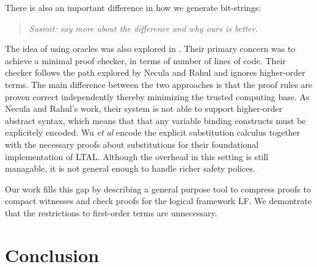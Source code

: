 \documentclass{acmconf}
\newenvironment{note}{\begin{quote}\message{note!}\it}{\end{quote}}
\begin{document}
There is also
an important difference in how we generate bit-strings:

\begin{note}
  Susmit: say more about the difference and why ours is better.
\end{note}

The idea of using oracles was also explored in
\cite{Appel:PPDP03}. Their primary concern was to 
achieve a minimal proof checker, in terms of number of lines of
code. Their checker follows the path explored by Necula and Rahul and
ignores higher-order terms. The main difference between the two
approaches is that the proof rules are proven correct
independently thereby minimizing the trusted computing base.
As Necula and Rahul's work, their system is not able to support
higher-order abstract syntax, which means that  
that any variable binding constructs must be
explicitely encoded. Wu {\em et al}\cite{Appel:PPDP03}
encode the explicit substitution calculus \cite{Abadi:POPL90} together
with the necessary proofs about substitutions for their foundational
implementation of LTAL. Although the overhead in this setting is still
managable, it is not general enough to handle richer safety polices.

 Our work fills this gap by describing a general purpose tool to
 compress proofs to compact witnesses and check proofs for the logical
framework LF. We demontrate that the restrictions to first-order terms
are unnecessary. 

\section{Conclusion}




\end{document}
